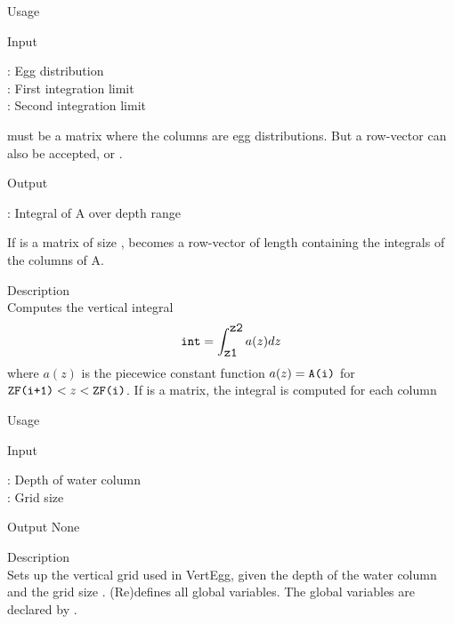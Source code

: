 {\begin{tdesc}
\item[Usage]  
\item[Input]
   \begin{vartab}    
     \> : \>  Egg distribution \> [eggs/m$^3$] \\
    \> : \>  First integration limit \>  [\m] \\
    \> : \> Second integration limit \> [\m]
   \end{vartab}
    must be a matrix where the columns are
   egg distributions. But a row-vector can also 
   be accepted,  or .
\item[Output]
   \begin{vartab}
    \> : \> Integral of A over depth range \> [eggs/m$^2$]
   \end{vartab}
   If  is a matrix of size ,  becomes
   a row-vector of length  containing the integrals
   of the columns of A.
\item[Description]\mbox{}\\
    Computes the vertical integral
    \begin{displaymath}
      {\mbox{\texttt{int}}} = \int_{\mbox{\texttt{z1}}}^{\mbox{\texttt{z2}}} a(z) dz
    \end{displaymath}
    where $a(z)$ is the piecewice constant function 
    $a(z) = {\mbox{\texttt{A(i)}}}$ for ${\mbox{\texttt{ZF(i+1)}}} < z < {\mbox{\texttt{ZF(i)}}}$.
    If  is a matrix, the integral is computed for each column
\end{tdesc}


\begin{tdesc}
\item[Usage]  
\item[Input]
  \begin{vartab} 
          \>  : \> Depth of water column  \> [m] \\
        \>  : \> Grid size              \> [m]
  \end{vartab}
\item[Output]
  None
\item[Description]\mbox{}\\
  Sets up the vertical grid used in VertEgg, given the depth
   of the water column and the grid size .
  (Re)defines all global variables.
  The global variables are declared by .
\end{tdesc}


}
